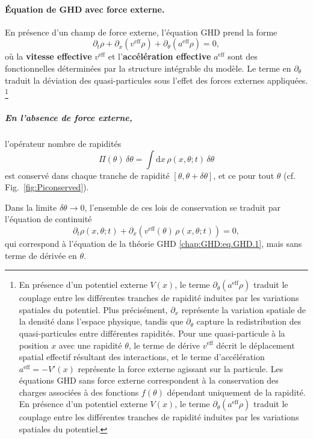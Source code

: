 \paragraph*{Équation de GHD avec force externe.}  
En présence d’un champ de force externe, l'équation \gls{GHD} prend la forme~\cite{10.21468/SciPostPhys.2.2.014}
\begin{equation}\label{chap:GHD:eq.GHD.1}
	\partial_t \rho + \partial_x \!\left(v^{\mathrm{eff}} \rho\right) 
	+ \partial_\theta \!\left(a^{\mathrm{eff}} \rho\right) = 0,
\end{equation}
où la {\bf vitesse effective} $v^{\mathrm{eff}}$ et l'{\bf accélération effective} $a^{\mathrm{eff}}$ sont des fonctionnelles déterminées par la structure intégrable du modèle. Le terme en $\partial_\theta$ traduit la déviation des quasi-particules sous l’effet des forces externes appliquées. 
\footnote{
	En présence d'un potentiel externe $V(x)$, le terme $\partial_\theta(a^{\mathrm{eff}}\rho)$ traduit le couplage entre les différentes tranches de rapidité induites par les variations spatiales du potentiel. Plus précisément, $\partial_x$ représente la variation spatiale de la densité dans l'espace physique, tandis que $\partial_\theta$ capture la redistribution des quasi-particules entre différentes rapidités. Pour une quasi-particule à la position $x$ avec une rapidité $\theta$, le terme de dérive $v^{\mathrm{eff}}$ décrit le déplacement spatial effectif résultant des interactions, et le terme d'accélération $a^{\mathrm{eff}} = -V'(x)$ représente la force externe agissant sur la particule.
	Les équations \gls{GHD} sans force externe correspondent à la conservation des charges associées à des fonctions $f(\theta)$ dépendant uniquement de la rapidité. En présence d'un potentiel externe $V(x)$, le terme $\partial_\theta(a^{\text{eff}}\rho)$ traduit le couplage entre les différentes tranches de rapidité induites par les variations spatiales du potentiel.
}

\subparagraph*{En l’absence de force externe,} l’opérateur nombre de rapidités
\begin{equation}
    \Pi(\theta)\,\delta\theta
    = \int \mathrm{d}x \, \rho(x,\theta;t)\,\delta\theta
\end{equation}
est conservé dans chaque tranche de rapidité
\([\theta,\theta+\delta\theta]\), et ce pour tout \(\theta\)
(cf. Fig.~\ref{fig:Piconserved}).

Dans la limite \(\delta\theta \to 0\), l’ensemble de ces lois de conservation se traduit par l’équation de continuité
\begin{equation}
    \partial_t \rho(x,\theta;t)
    + \partial_x\!\left(v^{\mathrm{eff}}(\theta)\,\rho(x,\theta;t)\right)
    = 0,
\end{equation}
qui correspond à l’équation de la théorie \gls{GHD} \eqref{chap:GHD:eq.GHD.1}, mais sans terme de dérivée en \(\theta\).

